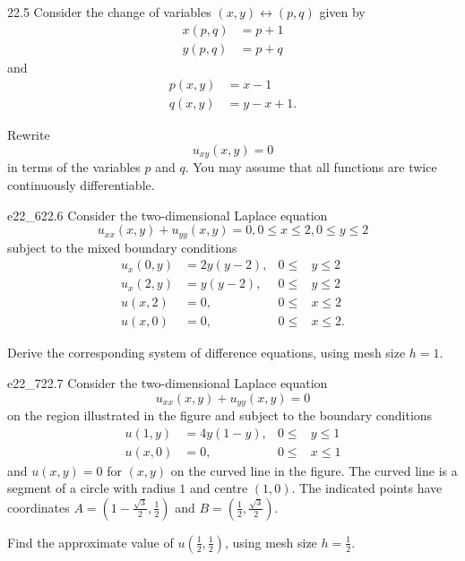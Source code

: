 \begin{problem}{22.5}
  Consider the change of variables $(x,y) \leftrightarrow (p,q)$ given by
  \begin{align*}
    x(p,q) &= p + 1 \\
    y(p,q) &= p + q
  \end{align*}
  and
  \begin{align*}
    p(x,y) &= x - 1 \\
    q(x,y) &= y - x + 1
  .\end{align*}

  Rewrite
  \begin{equation*}
    u_{xy}(x,y) = 0
  \end{equation*}
  in terms of the variables $p$ and $q$.
  You may assume that all functions are twice continuously differentiable.
\end{problem}

\begin{problemwithimage}{e22_6}{22.6}
  Consider the two-dimensional Laplace equation
  \begin{equation*}
    u_{x x}(x,y) + u_{yy}(x,y) = 0, 0 \leq x \leq 2, 0 \leq y \leq 2
  \end{equation*}
  subject to the mixed boundary conditions
  \begin{align*}
    u_x(0,y) &= 2y(y-2), & 0 \leq &y \leq 2 \\
    u_x(2,y) &= y(y-2), & 0\leq &y \leq 2 \\
    u(x,2) &= 0, & 0 \leq &x \leq 2 \\
    u(x,0) &= 0, & 0 \leq &x \leq 2
  .\end{align*}

  Derive the corresponding system of difference equations, using mesh size $h = 1$.
\end{problemwithimage}

\begin{problemwithimage}{e22_7}{22.7}
  Consider the two-dimensional Laplace equation
  \begin{equation*}
    u_{x x}(x,y) + u_{yy}(x,y) = 0
  \end{equation*}
  on the region illustrated in the figure and subject to the boundary conditions
  \begin{align*}
    u(1,y) &= 4y(1-y), & 0 \leq &y \leq 1 \\
    u(x,0) &= 0, & 0 \leq &x \leq 1
  \end{align*}
  and $u(x,y) = 0$ for $(x,y)$ on the curved line in the figure.
  The curved line is a segment of a circle with radius $1$ and centre $(1,0)$.
  The indicated points have coordinates $A = \left( 1 - \frac{\sqrt{3}}{2}, \frac{1}{2} \right)$ and $B = \left( \frac{1}{2}, \frac{\sqrt{3}}{2} \right)$.

  Find the approximate value of $u \left( \frac{1}{2}, \frac{1}{2} \right)$, using mesh size $h = \frac{1}{2}$.
\end{problemwithimage}
